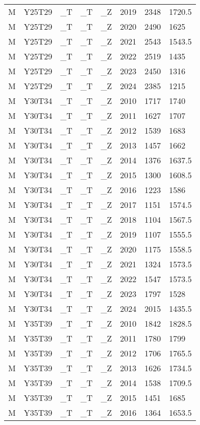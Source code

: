 \begin{longtable}[t]{llllllll}
M & Y25T29 & \_T & \_T & \_Z & 2019 & 2348 & 1720.5\\
\addlinespace
M & Y25T29 & \_T & \_T & \_Z & 2020 & 2490 & 1625\\
M & Y25T29 & \_T & \_T & \_Z & 2021 & 2543 & 1543.5\\
M & Y25T29 & \_T & \_T & \_Z & 2022 & 2519 & 1435\\
M & Y25T29 & \_T & \_T & \_Z & 2023 & 2450 & 1316\\
M & Y25T29 & \_T & \_T & \_Z & 2024 & 2385 & 1215\\
\addlinespace
M & Y30T34 & \_T & \_T & \_Z & 2010 & 1717 & 1740\\
M & Y30T34 & \_T & \_T & \_Z & 2011 & 1627 & 1707\\
M & Y30T34 & \_T & \_T & \_Z & 2012 & 1539 & 1683\\
M & Y30T34 & \_T & \_T & \_Z & 2013 & 1457 & 1662\\
M & Y30T34 & \_T & \_T & \_Z & 2014 & 1376 & 1637.5\\
\addlinespace
M & Y30T34 & \_T & \_T & \_Z & 2015 & 1300 & 1608.5\\
M & Y30T34 & \_T & \_T & \_Z & 2016 & 1223 & 1586\\
M & Y30T34 & \_T & \_T & \_Z & 2017 & 1151 & 1574.5\\
M & Y30T34 & \_T & \_T & \_Z & 2018 & 1104 & 1567.5\\
M & Y30T34 & \_T & \_T & \_Z & 2019 & 1107 & 1555.5\\
\addlinespace
M & Y30T34 & \_T & \_T & \_Z & 2020 & 1175 & 1558.5\\
M & Y30T34 & \_T & \_T & \_Z & 2021 & 1324 & 1573.5\\
M & Y30T34 & \_T & \_T & \_Z & 2022 & 1547 & 1573.5\\
M & Y30T34 & \_T & \_T & \_Z & 2023 & 1797 & 1528\\
M & Y30T34 & \_T & \_T & \_Z & 2024 & 2015 & 1435.5\\
\addlinespace
M & Y35T39 & \_T & \_T & \_Z & 2010 & 1842 & 1828.5\\
M & Y35T39 & \_T & \_T & \_Z & 2011 & 1780 & 1799\\
M & Y35T39 & \_T & \_T & \_Z & 2012 & 1706 & 1765.5\\
M & Y35T39 & \_T & \_T & \_Z & 2013 & 1626 & 1734.5\\
M & Y35T39 & \_T & \_T & \_Z & 2014 & 1538 & 1709.5\\
\addlinespace
M & Y35T39 & \_T & \_T & \_Z & 2015 & 1451 & 1685\\
M & Y35T39 & \_T & \_T & \_Z & 2016 & 1364 & 1653.5\\

\end{longtable}
